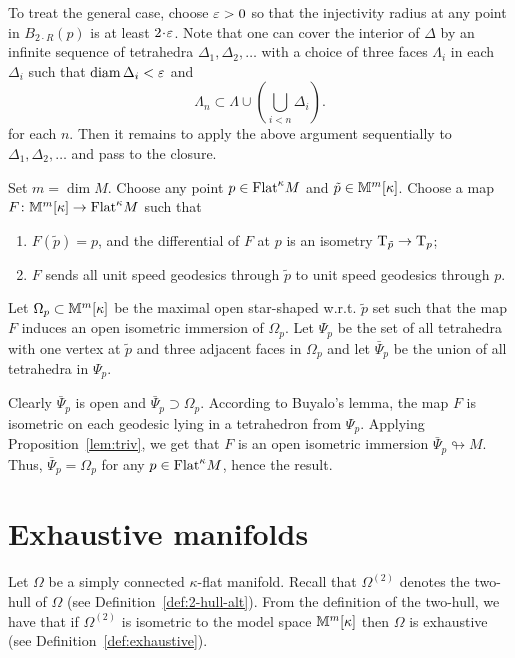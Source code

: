 \documentclass[oneside,a4paper]{article}
\begin{document}
To treat the general case, choose $\varepsilon>0$ so that the injectivity radius at any point in $B_{2\cdot R}(p)$ is at least $2\cdot\eps$.
Note that one can cover the interior of $\Delta$
by an infinite sequence of tetrahedra $\Delta_1,\Delta_2,\dots$
with a choice of three faces $\Lambda_i$ in each $\Delta_i$
such that $\mathop{\rm diam}\nolimits \Delta_i<\varepsilon$ and
$$\Lambda_n
\subset
\Lambda\cup\left(\bigcup_{i<n}\Delta_i\right).$$
for each $n$.
Then it remains to apply the above argument sequentially to $\Delta_1,\Delta_2,\dots$ and pass to the closure.
\qeds

Set $m=\dim M$.
Choose any point $p\in\mathrm{Flat}^\kappa M$ and $\tilde p \in \mathbb{M}^m[\kappa]$.
Choose a map $F\colon\mathbb{M}^m[\kappa]\to \mathrm{Flat}^\kappa M$ such that
\begin{enumerate}
\item $F(\tilde p)=p$,
and the differential of $F$ at $p$ is an isometry $\mathrm{T}_{\tilde p}\to \mathrm{T}_p$;
\item $F$ sends all unit speed geodesics through $\tilde p$ to unit speed geodesics through $p$.
\end{enumerate}

Let $\Omega_{p}\subset \mathbb{M}^m[\kappa]$ be the maximal open star-shaped w.r.t. $\tilde p$ set
such that the map $F$ induces an open isometric immersion of $\Omega_p$.
Let $\Psi_{p}$ be the set of all tetrahedra with one vertex at $\tilde p$ and three adjacent faces in $\Omega_{p}$
and let $\bar\Psi_{p}$ be the union of all tetrahedra in $\Psi_p$.

Clearly $\bar\Psi_{p}$ is open and $\bar\Psi_{p}\supset \Omega_{p}$.
According to Buyalo's lemma, the map $F$ is isometric on each geodesic lying in a tetrahedron from $\Psi_{p}$.
Applying Proposition~\ref{lem:triv}, we get that  $F$
is an open isometric immersion $\bar\Psi_{p} \looparrowright M$.
Thus, $\bar\Psi_{p}=\Omega_{p}$ for any $p\in \mathrm{Flat}^\kappa M$,
hence the result.
\qeds



\section{Exhaustive manifolds}\label{sec:exhaustive}

Let $\Omega$ be a simply connected $\kappa$-flat manifold.
Recall that $\Omega^{(2)}$ denotes the two-hull of $\Omega$ (see Definition~\ref{def:2-hull-alt}).
From the definition of the two-hull, we have that if $\Omega^{(2)}$ is isometric to the model space $\mathbb{M}^m[\kappa]$ then $\Omega$ is exhaustive (see Definition~\ref{def:exhaustive}).
\end{document}
